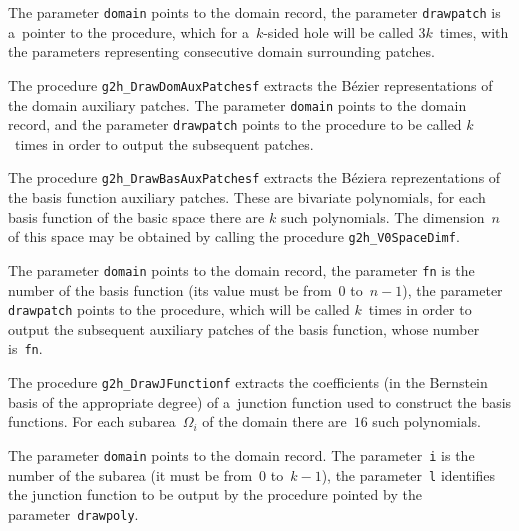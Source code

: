 The parameter \texttt{domain} points to the domain record, the parameter
\texttt{drawpatch} is a~pointer to the procedure, which for a~$k$-sided hole
will be called $3k$~times, with the parameters representing consecutive
domain surrounding patches.

\vspace{\bigskipamount}
The procedure \texttt{g2h\_DrawDomAuxPatchesf} extracts the B\'{e}zier
representations of the domain auxiliary patches. The parameter \texttt{domain}
points to the domain record, and the parameter \texttt{drawpatch} points
to the procedure to be called $k$~times in order to output the
subsequent patches.

\vspace{\bigskipamount}
The procedure \texttt{g2h\_DrawBasAuxPatchesf} extracts the B\'{e}ziera
reprezentations of the basis function auxiliary patches. These are
bivariate polynomials, for each basis function of the basic space
there are $k$ such polynomials. The dimension~$n$ of this space
may be obtained by calling the procedure \texttt{g2h\_V0SpaceDimf}.

The parameter \texttt{domain} points to the domain record, the parameter
\texttt{fn} is the number of the basis function (its value must be from~$0$
to~$n-1$), the parameter \texttt{drawpatch} points to the procedure, which
will be called $k$~times in order to output the subsequent auxiliary patches
of the basis function, whose number is~\texttt{fn}.

\vspace{\bigskipamount}
The procedure \texttt{g2h\_DrawJFunctionf} extracts the coefficients
(in the Bernstein basis of the appropriate degree) of a~junction function
used to construct the basis functions. For each subarea~$\varOmega_i$
of the domain there are~$16$ such polynomials.

The parameter \texttt{domain} points to the domain record. The parameter~\texttt{i}
is the number of the subarea (it must be from~$0$ to~$k-1$), the
parameter~\texttt{l} identifies the junction function to be output
by the procedure pointed by the parameter~\texttt{drawpoly}.

